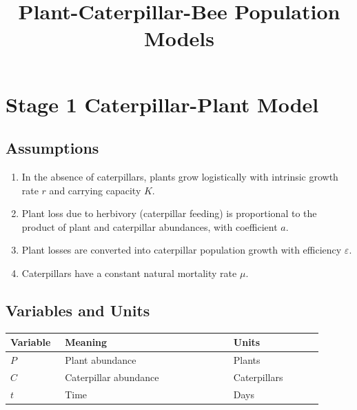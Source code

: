 \documentclass[11pt]{article}
\title{Plant-Caterpillar-Bee Population Models}
\begin{document}
\maketitle

\section{Stage 1 Caterpillar-Plant Model}

\subsection{Assumptions}
\begin{enumerate}
    \item In the absence of caterpillars, plants grow logistically with intrinsic
    growth rate $r$ and carrying capacity $K$.
    \item Plant loss due to herbivory (caterpillar feeding) is proportional to the product of plant
    and caterpillar abundances, with coefficient $a$.
    \item Plant losses are converted into caterpillar population growth with
    efficiency $\varepsilon$.
    \item Caterpillars have a constant natural mortality rate $\mu$.
\end{enumerate}

\subsection{Variables and Units}
\begin{center}
    \begin{tabular}{@{}p{0.15\linewidth}p{0.49\linewidth}p{0.26\linewidth}@{}}
        \hline
        Variable & Meaning & Units \\
        \hline
        $P$ & Plant abundance & Plants \\
        $C$ & Caterpillar abundance & Caterpillars \\
        $t$ & Time & Days \\
        \hline
    \end{tabular}
\end{center}
\end{document}
